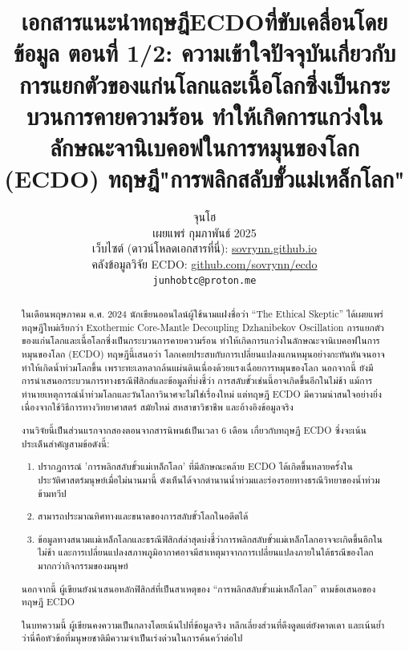 \documentclass[10pt,twocolumn,letterpaper]{article}
\begin{document}
\title{เอกสารแนะนำทฤษฎีECDOที่ขับเคลื่อนโดยข้อมูล  ตอนที่ 1/2: ความเข้าใจปัจจุบันเกี่ยวกับการแยกตัวของแก่นโลกและเนื้อโลกซึ่งเป็นกระบวนการคายความร้อน ทำให้เกิดการแกว่งในลักษณะจานิเบคอฟในการหมุนของโลก  (ECDO) ทฤษฎี"การพลิกสลับขั้วแม่เหล็กโลก"}

\author{จุนโฮ\\
เผยแพร่ กุมภาพันธ์ 2025\\
เว็บไซต์ (ดาวน์โหลดเอกสารที่นี่): \href{https://sovrynn.github.io}{sovrynn.github.io}\\
คลังข้อมูลวิจัย ECDO: \href{https://github.com/sovrynn/ecdo}{github.com/sovrynn/ecdo}\\
{\tt\small junhobtc@proton.me}
}
\maketitle

\begin{abstract}
ในเดือนพฤษภาคม ค.ศ. 2024  นักเขียนออนไลน์ผู้ใช้นามแฝงชื่อว่า “The Ethical Skeptic” \cite{0} ได้เผยแพร่ทฤษฎีใหม่เรียกว่า Exothermic Core-Mantle Decoupling Dzhanibekov Oscillation การแยกตัวของแก่นโลกและเนื้อโลกซึ่งเป็นกระบวนการคายความร้อน ทำให้เกิดการแกว่งในลักษณะจานิเบคอฟในการหมุนของโลก (ECDO) \cite{1} ทฤษฎีนี้เสนอว่า โลกเคยประสบกับการเปลี่ยนแปลงแกนหมุนอย่างกะทันหันจนอาจทำให้เกิดน้ำท่วมโลกขึ้น เพราะทะเลหลากล้นแผ่นดินเนื่องด้วยแรงเฉื่อยการหมุนของโลก นอกจากนี้ ยังมีการนำเสนอกระบวนการทางธรณีฟิสิกส์และข้อมูลที่บ่งชี้ว่า การสลับขั้วเช่นนี้อาจเกิดขึ้นอีกในไม่ช้า แม้การทำนายเหตุการณ์น้ำท่วมโลกและวันโลกาวินาศจะไม่ใช่เรื่องใหม่ แต่ทฤษฎี ECDO มีความน่าสนใจอย่างยิ่งเนื่องจากใช้วิธีการทางวิทยาศาสตร์ สมัยใหม่ สหสาขาวิชาชีพ และอ้างอิงข้อมูลจริง

งานวิจัยนี้เป็นส่วนแรกจากสองตอนจากสารนิพนธ์เป็นเวลา 6 เดือน \cite{2,20} เกี่ยวกับทฤษฎี ECDO ซึ่งจะเน้นประเด็นสำคัญสามข้อดังนี้:

\begin{flushleft}
\begin{enumerate}
    \item ปรากฏการณ์ 'การพลิกสลับขั้วแม่เหล็กโลก' ที่มีลักษณะคล้าย ECDO ได้เกิดขึ้นหลายครั้งในประวัติศาสตร์มนุษย์เมื่อไม่นานมานี้ ดังเห็นได้จากตำนานน้ำท่วมและร่องรอยทางธรณีวิทยาของน้ำท่วมข้ามทวีป
    \item สามารถประมาณทิศทางและขนาดของการสลับขั้วโลกในอดีตได้
    \item ข้อมูลทางสนามแม่เหล็กโลกและธรณีฟิสิกส์ล่าสุดบ่งชี้ว่าการพลิกสลับขั้วแม่เหล็กโลกอาจจะเกิดขึ้นอีกในไม่ช้า และการเปลี่ยนแปลงสภาพภูมิอากาศอาจมีสาเหตุมาจากการเปลี่ยนแปลงภายในใต้ธรณีของโลกมากกว่ากิจกรรมของมนุษย์
\end{enumerate}
\end{flushleft}

นอกจากนี้ ผู้เขียนยังนำเสนอหลักฟิสิกส์ที่เป็นสาเหตุของ “การพลิกสลับขั้วแม่เหล็กโลก” ตามข้อเสนอของทฤษฎี ECDO

ในบทความนี้ ผู้เขียนคงความเป็นกลางโดยเน้นไปที่ข้อมูลจริง หลีกเลี่ยงส่วนที่ดึงดูดแต่ยังคาดเดา และเน้นย้ำว่านี่คือหัวข้อที่มนุษยชาติมีความจำเป็นเร่งด่วนในการค้นคว้าต่อไป
\end{abstract}
\end{document}
